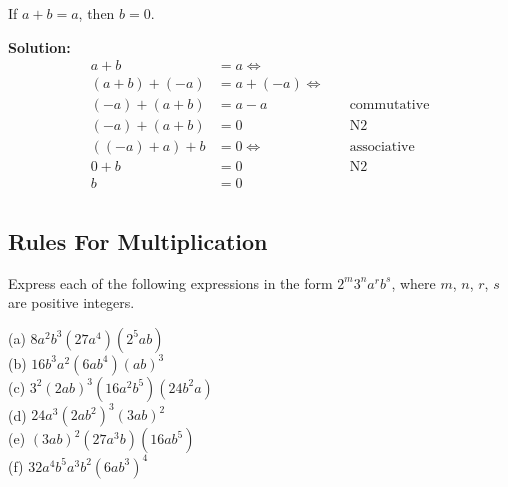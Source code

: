 \begin{tcolorbox}[title=23 Prove, breakable]
If $a + b = a$, then $b = 0$.
\end{tcolorbox}

\textbf{Solution:}
\begin{align*}
a + b &= a \Leftrightarrow & \quad \text{} \\
(a + b) + (-a) &= a + (-a) \Leftrightarrow & \quad \text{} \\
(-a) + (a + b) &= a - a & \quad \text{commutative} \\ 
(-a) + (a + b) &= 0 & \quad \text{N2}  \\
((-a) + a) + b &= 0 \Leftrightarrow & \quad \text{associative}  \\ 
0 + b &= 0  & \quad \text{N2}  \\
b &= 0 & \\
\end{align*}

\subsection{Rules For Multiplication}

Express each of the following expressions in the form $2^m 3^n a^r b^s$, where $m$,
$n$, $r$, $s$ are positive integers.
\begin{tcolorbox}[title=Problem 1, breakable]
(a) $8 a^2 b^3 (27 a^4) (2^5 a b)$ \\
(b) $16 b^3 a^2 (6 a b^4) {(a b)}^3$ \\
(c) $3^2 {(2 a b)}^3 (16 a^2 b^5) (24 b^2 a)$ \\
(d) $24 a^3 {(2 a b^2)}^3 {(3 a b)}^2$ \\
(e) ${(3 a b)}^2 (27 a^3 b) (16 a b^5)$ \\
(f) $32 a^4 b^5 a^3 b^2 {(6 a b^3)}^4$ \\
\end{tcolorbox}

